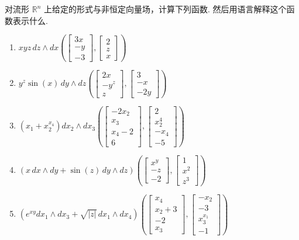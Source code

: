 \begin{question}\label{q:3-32}
对流形 $\mathbb{R}^n$ 上给定的形式与非恒定向量场，计算下列函数. 然后用语言解释这个函数表示什么.
\begin{enumerate}
  \item[(a)] $xyz\,dz\wedge dx\left(\begin{bmatrix}3x\\-y\\-3\end{bmatrix},\begin{bmatrix}2\\z\\x\end{bmatrix}\right)$
  \item[(b)] $y^z\sin(x)\,dy\wedge dz\left(\begin{bmatrix}2x\\-y^z\\z\end{bmatrix},\begin{bmatrix}3\\-x\\-2y\end{bmatrix}\right)$
  \item[(c)] $\left(x_1+x_2^{x_4}\right)dx_2\wedge dx_3\left(\begin{bmatrix}-2x_2\\x_3\\x_4-2\\6\end{bmatrix},\begin{bmatrix}2\\x_2^4\\-x_4\\-5\end{bmatrix}\right)$
  \item[(d)] $\left(x\,dx\wedge dy+\sin(z)\,dy\wedge dz\right)\left(\begin{bmatrix}x^y\\-z\\-2\end{bmatrix},\begin{bmatrix}1\\x^2\\z^3\end{bmatrix}\right)$
  \item[(e)] $\left(e^{xy}dx_1\wedge dx_3+\sqrt{|z|}\,dx_1\wedge dx_4\right)\left(\begin{bmatrix}x_4\\x_2+3\\-2\\x_3\end{bmatrix},\begin{bmatrix}-x_2\\-3\\x_3^{x_1}\\-1\end{bmatrix}\right)$

\end{enumerate}
\end{question}
